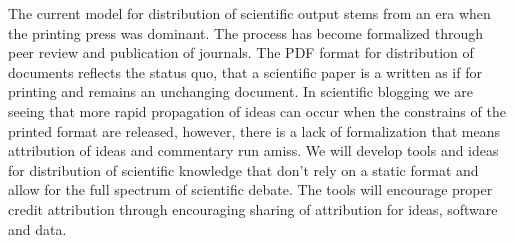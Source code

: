 \begin{workpackage}[id=social-aspects,wphases=1-48!.5,
  title=Social Aspects,
  lead=UO,
  UORM=1,USHRM=8, USORM=5]

\begin{tasklist}
\begin{task}[title=Modern Distribution of Scientific Output]
  The current model for distribution of scientific output stems from an era when the printing press was dominant. The process has become formalized through peer review and publication of journals. The PDF format for distribution of documents reflects the status quo, that a scientific paper is a written as if for printing and remains an unchanging document. In scientific blogging we are seeing that more rapid propagation of ideas can occur when the constrains of the printed format are released, however, there is a lack of formalization that means attribution of ideas and commentary run amiss. We will develop tools and ideas for distribution of scientific knowledge that don't rely on a static format and allow for the full spectrum of scientific debate. The tools will encourage proper credit attribution through encouraging sharing of attribution for ideas, software and data.
\end{task}


\end{tasklist}
\end{workpackage}
